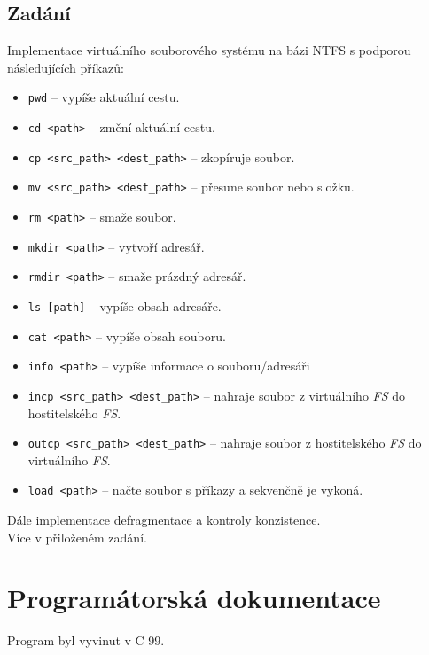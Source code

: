 \documentclass[12pt, a4paper]{report}
\begin{document}
\section{Zadání}
Implementace virtuálního souborového systému na bázi NTFS s podporou následujících příkazů:
\begin{itemize}
	\item \verb|pwd| -- vypíše aktuální cestu.
	\item \verb|cd <path>| -- změní aktuální cestu.
	\item \verb|cp <src_path> <dest_path>| -- zkopíruje soubor.
	\item \verb|mv <src_path> <dest_path>| -- přesune soubor nebo složku.
	\item \verb|rm <path>| -- smaže soubor.
	\item \verb|mkdir <path>| -- vytvoří adresář.
	\item \verb|rmdir <path>| -- smaže prázdný adresář.
	\item \verb|ls [path]| -- vypíše obsah adresáře.
	\item \verb|cat <path>| -- vypíše obsah souboru.
	\item \verb|info <path>| -- vypíše informace o souboru/adresáři
	\item \verb|incp <src_path> <dest_path>| -- nahraje soubor z virtuálního \emph{FS} do hostitelského \emph{FS}.
	\item \verb|outcp <src_path> <dest_path>| -- nahraje soubor z hostitelského \emph{FS} do virtuálního \emph{FS}.
	\item \verb|load <path>| -- načte soubor s příkazy a sekvenčně je vykoná.
\end{itemize}

\noindent
Dále implementace defragmentace a kontroly konzistence.\\

\noindent
Více v přiloženém zadání.


\chapter{Programátorská dokumentace}

Program byl vyvinut v C 99.
\end{document}

